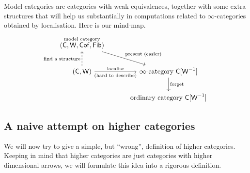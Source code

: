 Model categories are categories with weak equivalences,
together with some extra structures
that will help us substantially in computations related to
$\infty$-categories obtained by localisation.
Here is our mind-map.
\[ \begin{tikzcd}[column sep=3em,row sep=2em]
    \overset{\text{model category}}{(\cat C,\cat W,\cat{Cof},\cat{Fib})} \ar[dr,"\text{present }(\text{easier})"] \\
    (\cat C,\cat W) \ar[u,dashed,"\text{find a structure}"] \ar[r,"\text{localise}","(\text{hard to describe})"']
    & \infty\text{-category }\cat C[\cat W^{-1}] \ar[d,"\text{forget}"] \\
    & \text{ordinary category }\cat C[\cat W^{-1}]
\end{tikzcd} \]

\subsection{A naive attempt on higher categories}

We will now try to give a simple, but ``wrong'',
definition of higher categories.
Keeping in mind that higher categories
are just categories with higher dimensional arrows,
we will formulate this idea into a rigorous definition.

